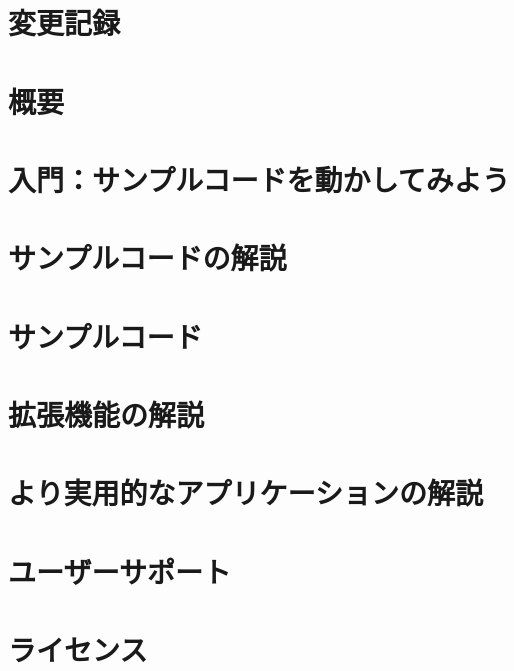 \documentclass[12pt,a4paper]{jarticle} %
\title{\docTitle}
\author{谷川衝}
\author{行方大輔}
\author{細野七月}
\author{岩澤全規}
\author{似鳥啓吾}
\author{村主崇行}
\author{野村昴太郎}
\author{牧野淳一郎}
\affil{\affiliation}
\date{}
\begin{document}
\maketitle
\tableofcontents

\clearpage

\section{変更記録}
\label{sec:changelog}

\clearpage

\section{概要}
\label{sec:overview}

\clearpage

\section{入門：サンプルコードを動かしてみよう}
\label{sec:getting_started}

\clearpage

\section{サンプルコードの解説}
\label{sec:how_to_use}

\clearpage

\section{サンプルコード}
\label{sec:samplecode}

\clearpage

\section{拡張機能の解説}
\label{sec:extension}

\clearpage

\section{より実用的なアプリケーションの解説}
\label{sec:applications}

\clearpage

\section{ユーザーサポート}
\label{sec:usersupport}

\clearpage

\section{ライセンス}
\label{sec:license}

\end{document}
